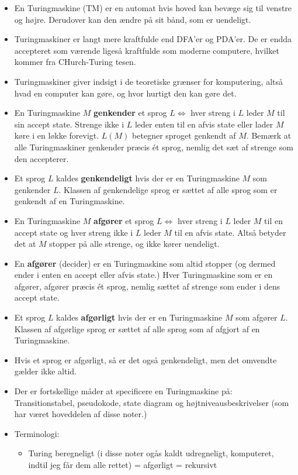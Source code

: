 \begin{itemize}
  \item En Turingmaskine (TM) er en automat hvis hoved kan bevæge sig til venstre og højre. Derudover kan den ændre på sit bånd, som er uendeligt.
  \item Turingmaskiner er langt mere kraftfulde end DFA'er og PDA'er. De er endda accepteret som værende ligeså kraftfulde som moderne computere, hvilket kommer fra CHurch-Turing tesen.
  \item Turingmaskiner giver indsigt i de teoretiske grænser for komputering, altså hvad en computer kan gøre, og hvor hurtigt den kan gøre det.
  \item En Turingmaskine $M$ \textbf{genkender} et sprog $L \iff$ hver streng i $L$ leder $M$ til sin accept state. Strenge ikke i $L$ leder enten til en afvis state eller lader $M$ køre i en løkke forevigt. $L(M)$ betegner sproget genkendt af $M$. Bemærk at alle Turingmaskiner genkender præcis ét sprog, nemlig det sæt af strenge som den accepterer.
  \item Et sprog $L$ kaldes \textbf{genkendeligt} hvis der er en Turingmaskine $M$ som genkender $L$. Klassen af genkendelige sprog er sættet af alle sprog som er genkendt af en Turingmaskine.
  \item En Turingmaskine $M$ \textbf{afgører} et sprog $L \iff$ hver streng i $L$ leder $M$ til en accept state og hver streng ikke i $L$ leder $M$ til en afvis state. Altså betyder det at $M$ stopper på alle strenge, og ikke kører uendeligt.
  \item En \textbf{afgører} (decider) er en Turingmaskine som altid stopper (og dermed ender i enten en accept eller afvis state.) Hver Turingmaskine som er en afgører, afgører præcis ét sprog, nemlig sættet af strenge som ender i dens accept state.
  \item Et sprog $L$ kaldes \textbf{afgørligt} hvis der er en Turingmaskine $M$ som afgører $L$. Klassen af afgørlige sprog er sættet af alle sprog som af afgjort af en Turingmaskine.
  \item Hvis et sprog er afgørligt, så er det også genkendeligt, men det omvendte gælder ikke altid.
  \item Der er fortskellige måder at specificere en Turingmaskine på: Transitionstabel, pseudokode, state diagram og højtniveausbeskrivelser (som har været hoveddelen af disse noter.)
  \item Terminologi:
		\begin{itemize}
		  \item Turing beregneligt (i disse noter ogås kaldt udregneligt, komputeret, indtil jeg får dem alle rettet) = afgørligt = rekursivt

\end{itemize}
\end{itemize}
